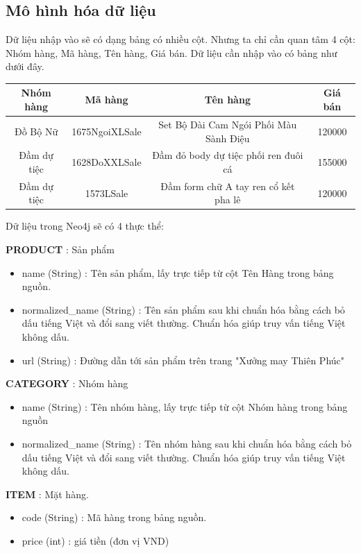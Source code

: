 \subsection{Mô hình hóa dữ liệu}

Dữ liệu nhập vào sẽ có dạng bảng có nhiều cột. Nhưng ta chỉ cần quan tâm 4 cột: Nhóm hàng, Mã hàng, Tên hàng, Giá bán. Dữ liệu cần nhập vào có bảng như dưới đây.

\begin{center}
 \begin{tabular}{||c c c c||} 
 \hline
 Nhóm hàng & Mã hàng & Tên hàng & Giá bán \\ [0.5ex] 
 \hline\hline
 Đồ Bộ Nữ & 1675NgoiXLSale & Set Bộ Dài Cam Ngói Phối Màu Sành Điệu & 120000 \\ 
 \hline
 Đầm dự tiệc & 1628DoXXLSale & Đầm đỏ body dự tiệc phối ren đuôi cá & 155000 \\
 \hline
  Đầm dự tiệc & 1573LSale & Đầm form chữ A tay ren cổ kết pha lê  & 120000 \\ [1ex] 
 \hline
\end{tabular}
\end{center}

Dữ liệu trong Neo4j sẽ có 4 thực thể: \pagebreak

\textbf{PRODUCT} : Sản phẩm 
\begin{itemize}
\item name (String) : Tên sản phẩm, lấy trực tiếp từ cột Tên Hàng trong bảng nguồn. 
\item normalized\_name (String) : Tên sản phẩm sau khi chuẩn hóa bằng cách bỏ dấu tiếng Việt và đổi sang viết thường. Chuẩn hóa giúp truy vấn tiếng Việt không dấu. 
\item url (String) : Đường dẫn tới sản phẩm trên trang "Xưởng may Thiên Phúc" 
\end{itemize}


\textbf{CATEGORY} : Nhóm hàng 
\begin{itemize}
\item name (String) : Tên nhóm hàng, lấy trực tiếp từ cột Nhóm hàng trong bảng nguồn
\item normalized\_name (String) : Tên nhóm hàng sau khi chuẩn hóa bằng cách bỏ dấu tiếng Việt và đổi sang viết thường. Chuẩn hóa giúp truy vấn tiếng Việt không dấu. 
\end{itemize}

\textbf{ITEM} : Mặt hàng. 
\begin{itemize}
\item code (String) : Mã hàng trong bảng nguồn. 
\item price (int) : giá tiền (đơn vị VND)  
\end{itemize}


